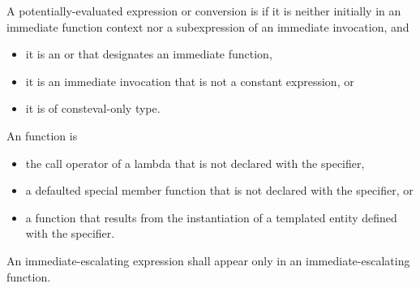 \pnum
{}%
%
%
%
A potentially-evaluated expression or conversion is 
if it is neither initially in an immediate function context
nor a subexpression of an immediate invocation, and
\begin{itemize}
\item
it is an  or 
that designates an immediate function,
\item
it is an immediate invocation that is not a constant expression, or
\item
it is of consteval-only type.
\end{itemize}

\pnum
{}%
An  function is
\begin{itemize}
\item
the call operator of a lambda that is not declared
with the  specifier,
\item
a defaulted special member function
that is not declared with the  specifier, or
\item
a function that results from the instantiation
of a templated entity defined with the  specifier.
\end{itemize}
An immediate-escalating expression shall appear only
in an immediate-escalating function.


